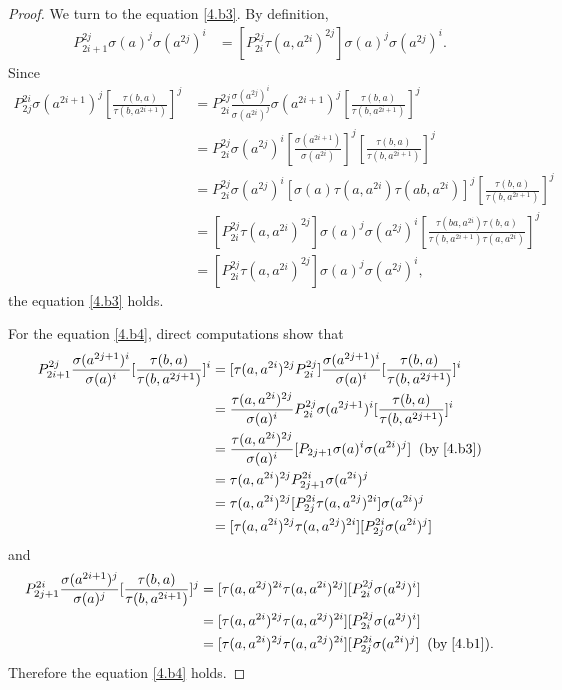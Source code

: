 \documentclass[a4paper,11pt]{amsart}
\numberwithin{equation}{section}
\begin{document}
\begin{proof}
We turn to the equation \eqref{4.b3}.  By definition,
\begin{align*}
P_{2i+1}^{2j}\sigma(a)^j\sigma(a^{2j})^i&=[P_{2i}^{2j}\tau(a,a^{2i})^{2j}]
\sigma(a)^j\sigma(a^{2j})^i.
\end{align*}
Since
\begin{align*}
P_{2j}^{2i} \sigma(a^{2i+1})^j
[\frac{\tau(b,a)}{\tau(b,a^{2i+1})}]^j&=P_{2i}^{2j} \frac{\sigma(a^{2j})^i}{\sigma(a^{2i})^j}
\sigma(a^{2i+1})^j [\frac{\tau(b,a)}{\tau(b,a^{2i+1})}]^j\\
&=P_{2i}^{2j} \sigma(a^{2j})^i [\frac{\sigma(a^{2i+1})}{\sigma(a^{2i})}]^j [\frac{\tau(b,a)}{\tau(b,a^{2i+1})}]^j\\
&=P_{2i}^{2j} \sigma(a^{2j})^i [\sigma(a) \tau(a,a^{2i}) \tau(ab,a^{2i})]^j [\frac{\tau(b,a)}{\tau(b,a^{2i+1})}]^j\\
&=[P_{2i}^{2j}\tau(a,a^{2i})^{2j}]\sigma(a)^j\sigma(a^{2j})^i [\frac{\tau(ba,a^{2i}) \tau(b,a)}{\tau(b,a^{2i+1})\tau(a,a^{2i})}]^j\\
&=[P_{2i}^{2j}\tau(a,a^{2i})^{2j}]\sigma(a)^j\sigma(a^{2j})^i,
\end{align*}
the equation \eqref{4.b3} holds.

For the equation \eqref{4.b4}, direct computations show that
\begin{align*}
P_{2i+1}^{2j} \frac{\sigma(a^{2j+1})^i}{\sigma(a)^i} [\frac{\tau(b,a)}{\tau(b,a^{2j+1})}]^i&=
[\tau(a,a^{2i})^{2j}P_{2i}^{2j}] \frac{\sigma(a^{2j+1})^i}{\sigma(a)^i} [\frac{\tau(b,a)}{\tau(b,a^{2j+1})}]^i\\
&=\frac{\tau(a,a^{2i})^{2j}}{\sigma(a)^i} P_{2i}^{2j} \sigma(a^{2j+1})^i [\frac{\tau(b,a)}{\tau(b,a^{2j+1})}]^i\\
&=\frac{\tau(a,a^{2i})^{2j}}{\sigma(a)^i}[P_{2j+1} \sigma(a)^i \sigma(a^{2i})^j]\;\;(\text{by}\; \eqref{4.b3} )\\
&=\tau(a,a^{2i})^{2j} P_{2j+1}^{2i} \sigma(a^{2i})^j\\
&=\tau(a,a^{2i})^{2j} [P_{2j}^{2i} \tau(a,a^{2j})^{2i}] \sigma(a^{2i})^j\\
&=[\tau(a,a^{2i})^{2j}\tau(a,a^{2j})^{2i}] [P_{2j}^{2i}\sigma(a^{2i})^j]
\end{align*}
and
\begin{align*}
P_{2j+1}^{2i} \frac{\sigma(a^{2i+1})^j}{\sigma(a)^j}[\frac{\tau(b,a)}{\tau(b,a^{2i+1})}]^j&=
[\tau(a,a^{2j})^{2i}\tau(a,a^{2i})^{2j}] [P_{2i}^{2j}\sigma(a^{2j})^i]\\
&=[\tau(a,a^{2i})^{2j}\tau(a,a^{2j})^{2i}] [P_{2i}^{2j}\sigma(a^{2j})^i]\\
&=[\tau(a,a^{2i})^{2j}\tau(a,a^{2j})^{2i}] [P_{2j}^{2i}\sigma(a^{2i})^j]\;\;(\text{by}\;\eqref{4.b1}).
\end{align*}
Therefore the equation \eqref{4.b4} holds.


\end{proof}
\end{document}
